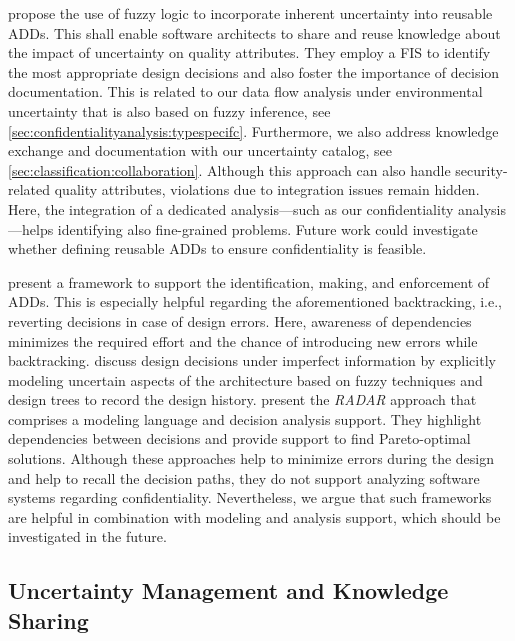 \textcite{lytra_supporting_2013} propose the use of fuzzy logic to incorporate inherent uncertainty into reusable \acp{ADD}.
This shall enable software architects to share and reuse knowledge about the impact of uncertainty on quality attributes.
They employ a \acf{FIS} to identify the most appropriate design decisions and also foster the importance of decision documentation.
This is related to our data flow analysis under environmental uncertainty that is also based on fuzzy inference, see \autoref{sec:confidentialityanalysis:typespecifc}.
Furthermore, we also address knowledge exchange and documentation with our uncertainty catalog, see \autoref{sec:classification:collaboration}.
Although this approach can also handle security-related quality attributes, violations due to integration issues remain hidden.
Here, the integration of a dedicated analysis---such as our confidentiality analysis---helps identifying also fine-grained problems.
Future work could investigate whether defining reusable \acp{ADD} to ensure confidentiality is feasible.

\textcite{zimmermann_reusable_2007} present a framework to support the identification, making, and enforcement of \acp{ADD}.
This is especially helpful regarding the aforementioned backtracking, i.e., reverting decisions in case of design errors.
Here, awareness of dependencies minimizes the required effort and the chance of introducing new errors while backtracking.
\textcite{noppen_jar_software_2008} discuss design decisions under imperfect information by explicitly modeling uncertain aspects of the architecture based on fuzzy techniques and design trees to record the design history.
\textcite{busari_radar_2017} present the \emph{RADAR} approach \cite{busari_modelling_2019} that comprises a modeling language and decision analysis support.
They highlight dependencies between decisions and provide support to find Pareto-optimal solutions.
Although these approaches help to minimize errors during the design and help to recall the decision paths, they do not support analyzing software systems regarding confidentiality.
Nevertheless, we argue that such frameworks are helpful in combination with modeling and analysis support, which should be investigated in the future.


\subsection{Uncertainty Management and Knowledge Sharing}

